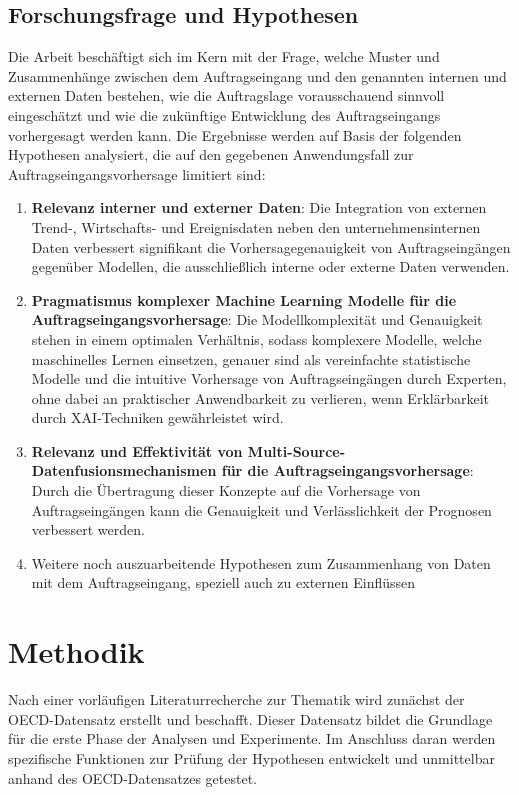 \documentclass[lettersize,journal]{IEEEtran}
\begin{document}
\subsection*{Forschungsfrage und Hypothesen}
Die Arbeit beschäftigt sich im Kern mit der Frage, welche Muster und Zusammenhänge zwischen dem Auftragseingang und den genannten internen und externen Daten bestehen, wie die Auftragslage vorausschauend sinnvoll eingeschätzt und wie die zukünftige Entwicklung des Auftragseingangs vorhergesagt werden kann. Die Ergebnisse werden auf Basis der folgenden Hypothesen analysiert, die auf den gegebenen Anwendungsfall zur Auftragseingangsvorhersage limitiert sind:
\begin{enumerate}
  \item \textbf{Relevanz interner und externer Daten}: Die Integration von externen Trend-, Wirtschafts- und Ereignisdaten neben den unternehmensinternen Daten verbessert signifikant die Vorhersagegenauigkeit von Auftragseingängen gegenüber Modellen, die ausschließlich interne oder externe Daten verwenden.
  \item \textbf{Pragmatismus komplexer Machine Learning Modelle für die Auftragseingangsvorhersage}: Die Modellkomplexität und Genauigkeit stehen in einem optimalen Verhältnis, sodass komplexere Modelle, welche maschinelles Lernen einsetzen, genauer sind als vereinfachte statistische Modelle und die intuitive Vorhersage von Auftragseingängen durch Experten, ohne dabei an praktischer Anwendbarkeit zu verlieren, wenn Erklärbarkeit durch XAI-Techniken gewährleistet wird.
  \item \textbf{Relevanz und Effektivität von Multi-Source-Datenfusionsmechanismen für die Auftragseingangsvorhersage}: Durch die Übertragung dieser Konzepte auf die Vorhersage von Auftragseingängen kann die Genauigkeit und Verlässlichkeit der Prognosen verbessert werden.
  \item Weitere noch auszuarbeitende Hypothesen zum Zusammenhang von Daten mit dem Auftragseingang, speziell auch zu externen Einflüssen
\end{enumerate}

\section*{Methodik}
Nach einer vorläufigen Literaturrecherche zur Thematik wird zunächst der OECD-Datensatz erstellt und beschafft. Dieser Datensatz bildet die Grundlage für die erste Phase der Analysen und Experimente. Im Anschluss daran werden spezifische Funktionen zur Prüfung der Hypothesen entwickelt und unmittelbar anhand des OECD-Datensatzes getestet.
\end{document}
